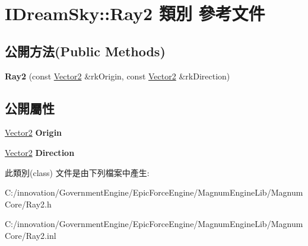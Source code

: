 \hypertarget{class_i_dream_sky_1_1_ray2}{}\section{I\+Dream\+Sky\+:\+:Ray2 類別 參考文件}
\label{class_i_dream_sky_1_1_ray2}
\subsection*{公開方法(Public Methods)}
\begin{DoxyCompactItemize}
\item 
{\bfseries Ray2} (const \hyperlink{class_i_dream_sky_1_1_vector2}{Vector2} \&rk\+Origin, const \hyperlink{class_i_dream_sky_1_1_vector2}{Vector2} \&rk\+Direction)\hypertarget{class_i_dream_sky_1_1_ray2_a4c323ebc28b051bdbceecc4839a6696d}{}\label{class_i_dream_sky_1_1_ray2_a4c323ebc28b051bdbceecc4839a6696d}

\end{DoxyCompactItemize}
\subsection*{公開屬性}
\begin{DoxyCompactItemize}
\item 
\hyperlink{class_i_dream_sky_1_1_vector2}{Vector2} {\bfseries Origin}\hypertarget{class_i_dream_sky_1_1_ray2_a3a2715159dccd59fd99013783f68d6af}{}\label{class_i_dream_sky_1_1_ray2_a3a2715159dccd59fd99013783f68d6af}

\item 
\hyperlink{class_i_dream_sky_1_1_vector2}{Vector2} {\bfseries Direction}\hypertarget{class_i_dream_sky_1_1_ray2_af636c3e860564e8675e0130cebc6abaf}{}\label{class_i_dream_sky_1_1_ray2_af636c3e860564e8675e0130cebc6abaf}

\end{DoxyCompactItemize}


此類別(class) 文件是由下列檔案中產生\+:\begin{DoxyCompactItemize}
\item 
C\+:/innovation/\+Government\+Engine/\+Epic\+Force\+Engine/\+Magnum\+Engine\+Lib/\+Magnum\+Core/Ray2.\+h\item 
C\+:/innovation/\+Government\+Engine/\+Epic\+Force\+Engine/\+Magnum\+Engine\+Lib/\+Magnum\+Core/Ray2.\+inl\end{DoxyCompactItemize}
